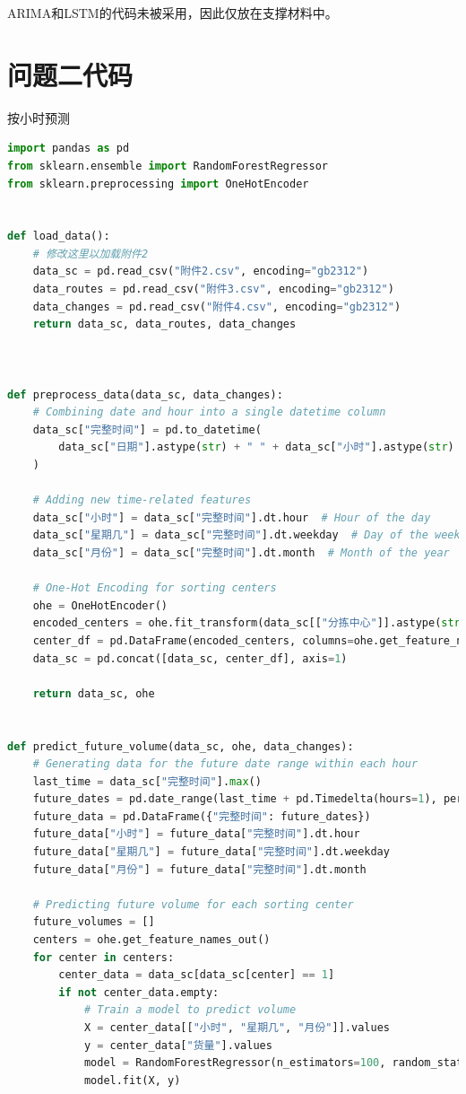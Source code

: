 \documentclass[UTF8]{article}%
\begin{document}
ARIMA和LSTM的代码未被采用，因此仅放在支撑材料中。


\section{问题二代码}
\noindent 按小时预测
\begin{lstlisting}[language=python]
import pandas as pd
from sklearn.ensemble import RandomForestRegressor
from sklearn.preprocessing import OneHotEncoder


def load_data():
    # 修改这里以加载附件2
    data_sc = pd.read_csv("附件2.csv", encoding="gb2312")
    data_routes = pd.read_csv("附件3.csv", encoding="gb2312")
    data_changes = pd.read_csv("附件4.csv", encoding="gb2312")
    return data_sc, data_routes, data_changes



def preprocess_data(data_sc, data_changes):
    # Combining date and hour into a single datetime column
    data_sc["完整时间"] = pd.to_datetime(
        data_sc["日期"].astype(str) + " " + data_sc["小时"].astype(str) + ":00"
    )

    # Adding new time-related features
    data_sc["小时"] = data_sc["完整时间"].dt.hour  # Hour of the day
    data_sc["星期几"] = data_sc["完整时间"].dt.weekday  # Day of the week (Monday=0, Sunday=6)
    data_sc["月份"] = data_sc["完整时间"].dt.month  # Month of the year

    # One-Hot Encoding for sorting centers
    ohe = OneHotEncoder()
    encoded_centers = ohe.fit_transform(data_sc[["分拣中心"]].astype(str)).toarray()
    center_df = pd.DataFrame(encoded_centers, columns=ohe.get_feature_names_out())
    data_sc = pd.concat([data_sc, center_df], axis=1)

    return data_sc, ohe


def predict_future_volume(data_sc, ohe, data_changes):
    # Generating data for the future date range within each hour
    last_time = data_sc["完整时间"].max()
    future_dates = pd.date_range(last_time + pd.Timedelta(hours=1), periods=744, freq="h")
    future_data = pd.DataFrame({"完整时间": future_dates})
    future_data["小时"] = future_data["完整时间"].dt.hour
    future_data["星期几"] = future_data["完整时间"].dt.weekday
    future_data["月份"] = future_data["完整时间"].dt.month

    # Predicting future volume for each sorting center
    future_volumes = []
    centers = ohe.get_feature_names_out()
    for center in centers:
        center_data = data_sc[data_sc[center] == 1]
        if not center_data.empty:
            # Train a model to predict volume
            X = center_data[["小时", "星期几", "月份"]].values
            y = center_data["货量"].values
            model = RandomForestRegressor(n_estimators=100, random_state=42)
            model.fit(X, y)


\end{lstlisting}
\end{document}
